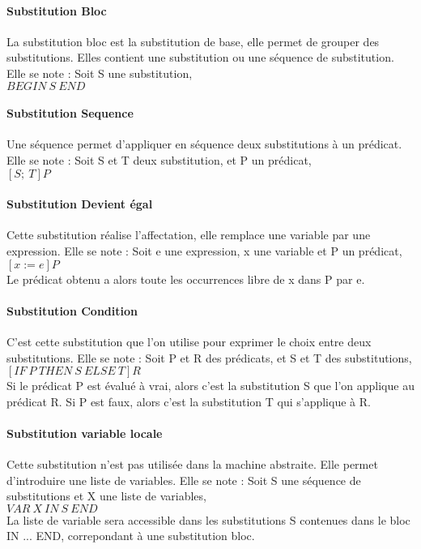 \paragraph{Substitution Bloc}
La substitution bloc est la substitution de base, elle permet de grouper des
substitutions. Elles contient une substitution ou une séquence de substitution.
Elle se note : Soit S une substitution, \\
$BEGIN~ S~ END$ 

\paragraph{Substitution Sequence}
Une séquence permet d'appliquer en séquence deux substitutions à un
prédicat. Elle se note : Soit S et T deux substitution, et P un prédicat, \\
$[S;~ T]P$

\paragraph{Substitution Devient égal}
Cette substitution réalise l'affectation, elle remplace une variable
par une expression. Elle se note : Soit e une expression, x une
variable et P un prédicat, \\ 
$[x:=e]P$  \\
Le prédicat obtenu a alors toute les occurrences libre de x dans P par e.

\paragraph{Substitution Condition}
C'est cette substitution que l'on utilise pour exprimer le choix entre deux
substitutions. Elle se note : Soit P et R des prédicats, et S et T des substitutions,\\
$[IF~ P~ THEN~ S~ ELSE~ T]R$ \\
Si le prédicat P est évalué à vrai, alors c'est la substitution S que l'on
applique au prédicat R. Si P est faux, alors c'est la substitution T qui
s'applique à R.

\paragraph{Substitution variable locale}
Cette substitution n'est pas utilisée dans la machine abstraite. Elle permet
d'introduire une liste de variables.
Elle se note : Soit S une séquence de substitutions et X une liste de variables,\\
$VAR~ X~ IN~ S~ END$\\
La liste de variable sera accessible dans les substitutions S contenues dans le
bloc IN ... END, correpondant à une substitution bloc.

